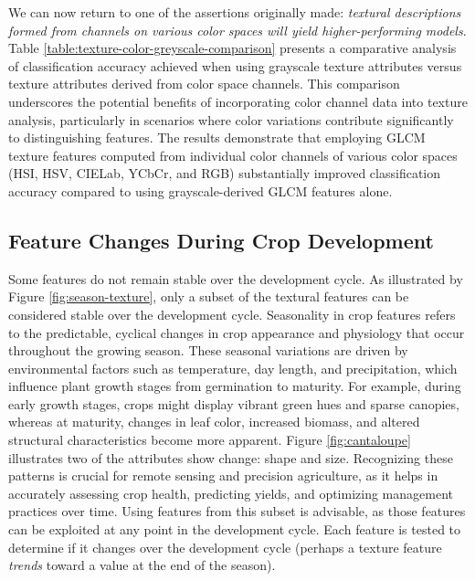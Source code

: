 \documentclass[letterpaper, notitlepage]{report}
\begin{document}
We can now return to one of the assertions originally made: \textit{textural descriptions formed from channels on various color spaces will yield higher-performing models}. Table \ref{table:texture-color-greyscale-comparison} presents a comparative analysis of classification accuracy achieved when using grayscale texture attributes versus texture attributes derived from color space channels. This comparison underscores the potential benefits of incorporating color channel data into texture analysis, particularly in scenarios where color variations contribute significantly to distinguishing features. The results demonstrate that employing GLCM texture features computed from individual color channels of various color spaces (HSI, HSV, CIELab, YCbCr, and RGB) substantially improved classification accuracy compared to using grayscale-derived GLCM features alone. 
{
\renewcommand{\arraystretch}{0.9}

%
%

}



\subsection{Feature Changes During Crop Development}
Some features do not remain stable over the development cycle. As illustrated by Figure \ref{fig:season-texture}, only a subset of the textural features can be considered stable over the development cycle. Seasonality in crop features refers to the predictable, cyclical changes in crop appearance and physiology that occur throughout the growing season. These seasonal variations are driven by environmental factors such as temperature, day length, and precipitation, which influence plant growth stages from germination to maturity. For example, during early growth stages, crops might display vibrant green hues and sparse canopies, whereas at maturity, changes in leaf color, increased biomass, and altered structural characteristics become more apparent. Figure \ref{fig:cantaloupe} illustrates two of the attributes show change: shape and size. Recognizing these patterns is crucial for remote sensing and precision agriculture, as it helps in accurately assessing crop health, predicting yields, and optimizing management practices over time. Using features from this subset is advisable, as those features can be exploited at any point in the development cycle.  Each feature is tested to determine if it changes over the development cycle (perhaps a texture feature \textit{trends} toward a value at the end of the season).
\end{document}
